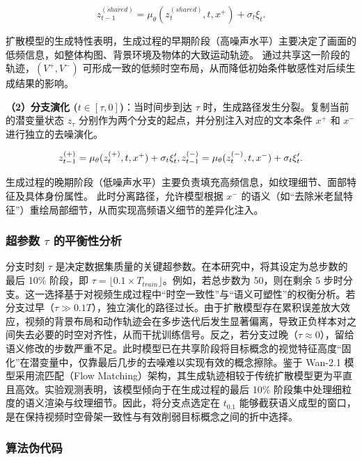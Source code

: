 \begin{equation}
z_{t-1}^{(shared)} = \mu_\theta(z_t^{(shared)}, t, x^+) + \sigma_t \xi_t.
\end{equation}

扩散模型的生成特性表明，生成过程的早期阶段（高噪声水平）主要决定了画面的低频信息，如整体构图、背景环境及物体的大致运动轨迹。
通过共享这一阶段的轨迹，$(V^+, V^-)$ 可形成一致的低频时空布局，从而降低初始条件敏感性对后续生成结果的影响。

\textbf{（2）分支演化 ($t \in [\tau, 0]$)}：当时间步到达 $\tau$ 时，生成路径发生分裂。复制当前的潜变量状态 $z_\tau$ 分别作为两个分支的起点，并分别注入对应的文本条件 $x^+$ 和 $x^-$ 进行独立的去噪演化。

\begin{equation}
z_{t-1}^{(+)} = \mu_\theta(z_t^{(+)}, t, x^+) + \sigma_t \xi_t' ,\\
z_{t-1}^{(-)} = \mu_\theta(z_t^{(-)}, t, x^-) + \sigma_t \xi_t' .
\end{equation}

生成过程的晚期阶段（低噪声水平）主要负责填充高频信息，如纹理细节、面部特征及具体身份属性。
此时分离路径，允许模型根据 $x^-$ 的语义（如“去除米老鼠特征”）重绘局部细节，从而实现高频语义细节的差异化注入。

\subsubsection{超参数 $\tau$ 的平衡性分析}

分支时刻 $\tau$ 是决定数据集质量的关键超参数。在本研究中，将其设定为总步数的最后 10\% 阶段，即 $\tau = \lfloor 0.1 \times T_{train} \rfloor$。例如，若总步数为 50，则在剩余 5 步时分支。这一选择基于对视频生成过程中“时空一致性”与“语义可塑性”的权衡分析。若分支过早（$\tau \gg 0.1 T$），独立演化的路径过长。由于扩散模型存在累积误差放大效应，视频的背景布局和动作轨迹会在多步迭代后发生显著偏离，导致正负样本对之间失去必要的时空对齐性，从而干扰训练信号。反之，若分支过晚（$\tau \approx 0$），留给语义修改的步数严重不足。此时模型已在共享阶段将目标概念的视觉特征高度“固化”在潜变量中，仅靠最后几步的去噪难以实现有效的概念擦除。鉴于 Wan-2.1 模型采用流匹配（Flow Matching）架构，其生成轨迹相较于传统扩散模型更为平直且高效。实验观测表明，该模型倾向于在生成过程的最后 10\% 阶段集中处理细粒度的语义渲染与纹理细节。因此，将分支点选定在 $t_{0.1}$ 能够截获语义成型的窗口，是在保持视频时空骨架一致性与有效削弱目标概念之间的折中选择。

\subsubsection{算法伪代码}

